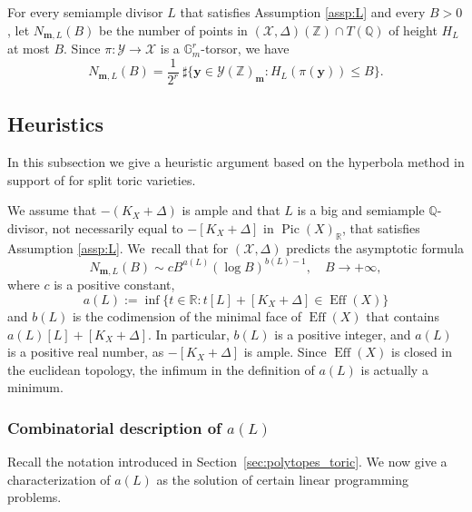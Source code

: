 \documentclass[11pt]{article}
\numberwithin{equation}{section}
\newcommand{\bfy}{\boldsymbol{y}}
\newcommand{\bfm}{{\boldsymbol{m}}}
\newcommand\ZZ{\mathbb{Z}}
\newcommand\RR{\mathbb{R}}
\newcommand\QQ{\mathbb{Q}}
\newcommand\GG{\mathbb{G}}
\DeclareMathOperator{\pic}{Pic}
\DeclareMathOperator{\eff}{Eff}
\theoremstyle{definition}
\numberwithin{theorem}{section}
\begin{document}
For every semiample divisor $L$ that satisfies Assumption \ref{assp:L} and every $B>0$, let
$N_{\bfm, L}(B)$ be the number of points in $(\mathscr{X},\Delta)(\ZZ)\cap T(\QQ)$
of height $H_L$ at most $B$.
Since $\pi:\mathscr Y\to\mathscr X$ is a $\GG_m^r$-torsor, we have
\[
N_{\bfm,L}(B)=\frac 1{2^r}\ \sharp\{\bfy\in\mathscr{Y}(\ZZ)_{\bfm}: H_L(\pi(\bfy))\leq B\}.
\]

\subsection{Heuristics}
\label{sec:heuristics}
In this subsection we give a heuristic argument based on the hyperbola method
in support of \cite[Conj.\,1.1]{PSTVA} for split toric varieties.

We assume that $-(K_X+\Delta)$ is ample and that $L$ is a big and semiample $\mathbb Q$-divisor,
not necessarily equal to $-[K_X+\Delta]$ in $\pic(X)_{\RR}$, that satisfies Assumption \ref{assp:L}.
We~recall that \cite[Conj.\,1.1]{PSTVA} for $(\mathscr X,\Delta)$ predicts the asymptotic formula
\begin{equation}
\label{eq:conjecture}
N_{\bfm,L}(B)\sim c B^{a(L)}(\log B)^{b(L)-1}, \quad B\to+\infty,
\end{equation}
where $c$ is a positive constant,
\begin{equation}
a(L):=\inf\{t\in \RR: t[L]+[K_X+\Delta] \in \eff(X)\}
\end{equation}
and $b(L)$ is the codimension of the minimal face of $\eff(X)$ that contains
$a(L)[L]+[K_X+\Delta]$.
In particular, $b(L)$ is a positive integer, and $a(L)$ is a positive real number, as $-[K_X+\Delta]$ is ample. Since $\eff(X)$ is closed in the euclidean topology, the infimum in
the definition of $a(L)$ is actually a minimum.

\subsubsection{Combinatorial description of $a(L)$}
\label{sec:combinatorial_description_a}

Recall the notation introduced in Section~\ref{sec:polytopes_toric}.
We now give a characterization of $a(L)$ as the solution of certain linear programming problems.
\end{document}
